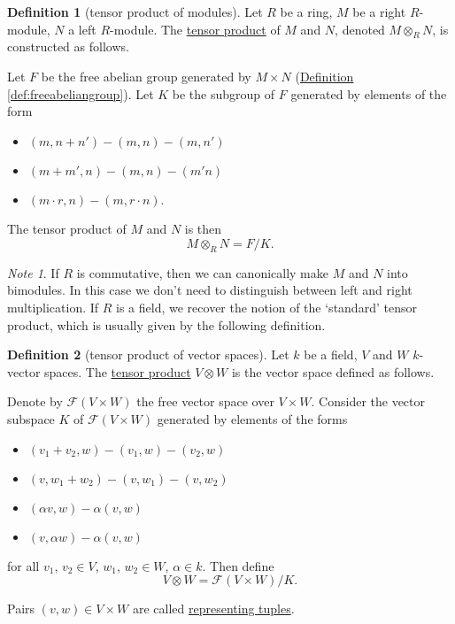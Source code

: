 \documentclass[a4paper]{report}
\newcommand{\defn}[1]{\ul{#1}}
\theoremstyle{definition}
\newtheorem{definition}{Definition}[section]
\theoremstyle{plain}
\theoremstyle{remark}
\newtheorem{note}{Note}[section]
\begin{document}
\begin{definition}[tensor product of modules]
  \label{def:tensorproductofmodules}
  Let $R$ be a ring, $M$ be a right $R$-module, $N$ a left $R$-module. The \defn{tensor product} of $M$ and $N$, denoted $M \otimes_{R} N$, is constructed as follows.

  Let $F$ be the free abelian group generated by $M \times N$ (\hyperref[def:freeabeliangroup]{Definition \ref*{def:freeabeliangroup}}). Let $K$ be the subgroup of $F$ generated by elements of the form
  \begin{itemize}
    \item $(m, n + n') - (m, n) - (m, n')$
    \item $(m + m', n) - (m, n) - (m' n)$
    \item $(m \cdot r, n) - (m, r \cdot n)$.
  \end{itemize}

  The tensor product of $M$ and $N$ is then
  \begin{equation*}
    M \otimes_{R} N = F / K.
  \end{equation*}
\end{definition}

\begin{note}
  If $R$ is commutative, then we can canonically make $M$ and $N$ into bimodules. In this case we don't need to distinguish between left and right multiplication. If $R$ is a field, we recover the notion of the `standard' tensor product, which is usually given by the following definition.
\end{note}

\begin{definition}[tensor product of vector spaces]
  \label{def:tensorproductofvectorspaces}
  Let $k$ be a field, $V$ and $W$ $k$-vector spaces. The \defn{tensor product} $V \otimes W$ is the vector space defined as follows.

  Denote by $\mathcal{F}(V \times W)$ the free vector space over $V \times W$. Consider the vector subspace $K$ of $\mathcal{F}(V \times W)$ generated by elements of the forms 
  \begin{itemize}
    \item $(v_{1} + v_{2}, w) - (v_{1}, w) - (v_{2}, w)$
    \item $(v, w_{1} + w_{2}) - (v, w_{1}) - (v, w_{2})$
    \item $(\alpha v, w) - \alpha (v, w)$
    \item $(v, \alpha w) - \alpha (v, w)$
  \end{itemize}
  for all $v_{1}$, $v_{2} \in V$, $w_{1}$, $w_{2} \in W$, $\alpha \in k$. Then define
  \begin{equation*}
    V \otimes W = \mathcal{F}(V \times W) / K.
  \end{equation*}

  Pairs $(v, w) \in V \times W$ are called \defn{representing tuples}.
\end{definition}
\end{document}
